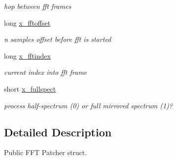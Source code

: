 \begin{DoxyCompactItemize}
\begin{DoxyCompactList}\small\item\em hop between fft frames \item\end{DoxyCompactList}\item 
\hypertarget{structt__pfftpub_a7e7e6c74c504ef54d77d61c4a83d060d}{
long \hyperlink{structt__pfftpub_a7e7e6c74c504ef54d77d61c4a83d060d}{x\_\-fftoffset}}
\label{structt__pfftpub_a7e7e6c74c504ef54d77d61c4a83d060d}

\begin{DoxyCompactList}\small\item\em n samples offset before fft is started \item\end{DoxyCompactList}\item 
\hypertarget{structt__pfftpub_a5fa88e6b8dd3c99abaefe1bc9cb316b1}{
long \hyperlink{structt__pfftpub_a5fa88e6b8dd3c99abaefe1bc9cb316b1}{x\_\-fftindex}}
\label{structt__pfftpub_a5fa88e6b8dd3c99abaefe1bc9cb316b1}

\begin{DoxyCompactList}\small\item\em current index into fft frame \item\end{DoxyCompactList}\item 
\hypertarget{structt__pfftpub_aa2549e95d9411644da5774dd175614ef}{
short \hyperlink{structt__pfftpub_aa2549e95d9411644da5774dd175614ef}{x\_\-fullspect}}
\label{structt__pfftpub_aa2549e95d9411644da5774dd175614ef}

\begin{DoxyCompactList}\small\item\em process half-\/spectrum (0) or full mirrored spectrum (1)? \item\end{DoxyCompactList}\end{DoxyCompactItemize}


\subsection{Detailed Description}
Public FFT Patcher struct. 